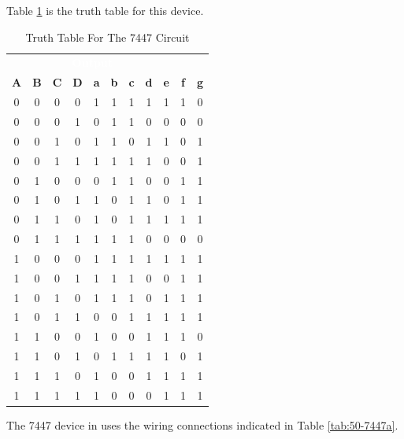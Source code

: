 Table \ref{tab:50-7447} is the truth table for this device. 

\begin{table}[H]
	\sffamily
	\newcommand{\head}[1]{\textcolor{white}{\textbf{#1}}}		
	\begin{center}
		\begin{tabular}{cccc | ccccccc} 
			\rowcolor{black!75}
			\multicolumn{4}{c}{\head{Inputs}} & \multicolumn{7}{c}{\head{Output}} \\
			\textbf{A} & \textbf{B} & \textbf{C} & \textbf{D} & \textbf{a} & \textbf{b} & \textbf{c} & \textbf{d} & \textbf{e} & \textbf{f} & \textbf{g} \\
			\hline
			0 & 0 & 0 & 0  & 1 & 1 & 1 & 1 & 1 & 1 & 0 \\
			0 & 0 & 0 & 1  & 0 & 1 & 1 & 0 & 0 & 0 & 0 \\
			0 & 0 & 1 & 0  & 1 & 1 & 0 & 1 & 1 & 0 & 1 \\
			0 & 0 & 1 & 1  & 1 & 1 & 1 & 1 & 0 & 0 & 1 \\
			0 & 1 & 0 & 0  & 0 & 1 & 1 & 0 & 0 & 1 & 1 \\
			0 & 1 & 0 & 1  & 1 & 0 & 1 & 1 & 0 & 1 & 1 \\
			0 & 1 & 1 & 0  & 1 & 0 & 1 & 1 & 1 & 1 & 1 \\
			0 & 1 & 1 & 1  & 1 & 1 & 1 & 0 & 0 & 0 & 0 \\
			1 & 0 & 0 & 0  & 1 & 1 & 1 & 1 & 1 & 1 & 1 \\
			1 & 0 & 0 & 1  & 1 & 1 & 1 & 0 & 0 & 1 & 1 \\
			1 & 0 & 1 & 0  & 1 & 1 & 1 & 0 & 1 & 1 & 1 \\
			1 & 0 & 1 & 1  & 0 & 0 & 1 & 1 & 1 & 1 & 1 \\
			1 & 1 & 0 & 0  & 1 & 0 & 0 & 1 & 1 & 1 & 0 \\
			1 & 1 & 0 & 1  & 0 & 1 & 1 & 1 & 1 & 0 & 1 \\
			1 & 1 & 1 & 0  & 1 & 0 & 0 & 1 & 1 & 1 & 1 \\
			1 & 1 & 1 & 1  & 1 & 0 & 0 & 0 & 1 & 1 & 1 \\
		\end{tabular}
	\end{center}
	\caption{Truth Table For The 7447 Circuit}
	\label{tab:50-7447}
\end{table}

The 7447 device in \LE uses the wiring connections indicated in Table \ref{tab:50-7447a}.

